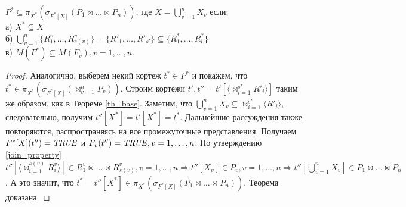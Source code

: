 \author{Мосин Сергей, Зыкин Сергей}
\def \bigcupn {\bigcup\limits_{v=1}^{n}}
\begin{theorem}
$P^{\ast} \subseteq \pi_{X^{\ast}} ( \sigma_{F^{\ast}[X]} (P_1 \bowtie \dots \bowtie P_n))$, где $X = \bigcupn X_{v}$ если:
\\а) $X^{\ast} \subseteq X$
\\б)
$ \bigcupn \{R^{v}_{1}, \ldots, R^{v}_{s(v)}\} = \{R'_{1}, \ldots, R'_{s'}\}
\subseteq
\{R^{\ast}_{1}, \ldots, R^{\ast}_{l}\} $
\\в) $M(F^{\ast}) \subseteq M(F_{v}), v = 1,\dots,n $.

\label{th_mult}
\end{theorem}
\begin{proof}
Аналогично, выберем некий кортеж $t^{\ast} \in P^{\ast}$ и покажем, 
что $t^{\ast} \in \pi_{X^{\ast}} ( \sigma_{F^{\ast}[X]} (\bowtie_{v=1}^{n} P_{v}))$. Строим кортежи
$t', t'' = t'[\langle {\bowtie}_{i=1}^{s'} R'_i \rangle]$ таким же образом,
как в Теореме \ref{th_base}. Заметим, что $\bigcupn X_{v} \subseteq 
{\bowtie}_{i=1}^{s'} \langle R'_i \rangle$, следовательно, получим
$t''[X^{\ast}] = t'[X^{\ast}] = t^{\ast}$.
Дальнейшие рассуждения также повторяются, распространяясь на все промежуточные представления. Получаем $F^{\ast} [X] (t'') = \mathit{TRUE}$ и $F_v (t'') = \mathit{TRUE}, v = 1,\dots,n $.
По утверждению \ref{join_property} $t''[\langle \bowtie_{i=1}^{s(v)} R^v_i \rangle]
\in 
R^v_1 \bowtie \dots \bowtie R^v_{s(v)}, v = 1, \dots, n
\Rightarrow   
t''[X_v] \in P_v, v = 1, \dots, n
\Rightarrow
t''[\bigcupn X_{v}] \in P_1 \bowtie \dots \bowtie P_n$.
А это значит, что $t^{\ast} = t''[X^{\ast}] \in 
\pi_{X^{\ast}} ( \sigma_{F^{\ast}[X]} (P_1 \bowtie \dots \bowtie P_n))$.
Теорема доказана.
\end{proof}
